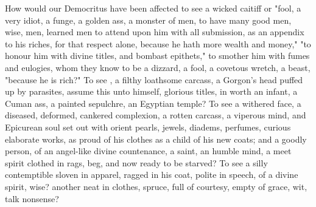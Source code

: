 How would our Democritus have been affected to see a wicked caitiff or
"fool, a very idiot, a funge, a golden ass, a monster of
men, to have many good men, wise, men, learned men to attend upon him with all
submission, as an appendix to his riches, for that respect alone, because he
hath more wealth and money," "to honour him with divine
titles, and bombast epithets," to smother him with fumes and eulogies, whom
they know to be a dizzard, a fool, a covetous wretch, a beast, \etc{} "because
he is rich?" To see , a filthy loathsome
carcass, a Gorgon's head puffed up by parasites, assume this unto himself,
glorious titles, in worth an infant, a Cuman ass, a painted sepulchre, an
Egyptian temple? To see a withered face, a diseased, deformed, cankered
complexion, a rotten carcass, a viperous mind, and Epicurean soul set out with
orient pearls, jewels, diadems, perfumes, curious elaborate works, as proud of
his clothes as a child of his new coats; and a goodly person, of an angel-like
divine countenance, a saint, an humble mind, a meet spirit clothed in rags,
beg, and now ready to be starved? To see a silly contemptible sloven in
apparel, ragged in his coat, polite in speech, of a divine spirit, wise?
another neat in clothes, spruce, full of courtesy, empty of grace, wit, talk
nonsense?

